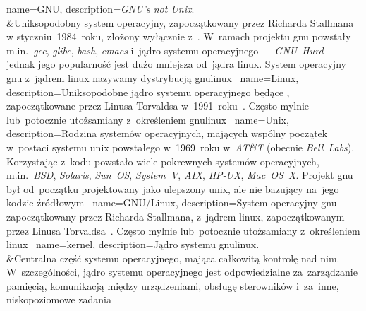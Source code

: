 %
%

{
	name={GNU},
	description={\emph{GNU’s not Unix}.\\&Uniksopodobny system operacyjny, zapoczątkowany przez Richarda Stallmana w styczniu~1984~roku, złożony wyłącznie z~. W~ramach projektu \gls{gnu} powstały m.in.~\emph{gcc}, \emph{glibc}, \emph{bash}, \emph{emacs} i~jądro systemu operacyjnego --- \emph{GNU~Hurd} --- jednak jego popularność jest dużo mniejsza od~jądra \gls{linux}. System operacyjny \gls{gnu} z~jądrem \gls{linux} nazywamy dystrybucją \gls{gnulinux}~\cite{gnu,gnulinux,gnu-faq,wiki:linux-naming-controversy}}
}
{
	name={Linux},
	description={Uniksopodobne jądro systemu operacyjnego będące , zapoczątkowane przez Linusa Torvaldsa w~1991~roku~\cite{linux-kernel}. Często mylnie lub~potocznie utożsamiany z~określeniem \gls{gnulinux}~\cite{gnu-faq,wiki:linux-naming-controversy}}
}
{
	name={Unix},
	description={Rodzina systemów operacyjnych, mających wspólny początek w~postaci systemu \gls{unix} powstałego w~1969~roku w~\emph{AT\&T} (obecnie \emph{Bell~Labs}). Korzystając z~kodu  powstało wiele pokrewnych systemów operacyjnych, m.in.~\emph{BSD}, \emph{Solaris}, \emph{Sun~OS}, \emph{System~V}, \emph{AIX}, \emph{HP-UX}, \emph{Mac~OS~X}. Projekt \gls{gnu} był od~początku projektowany jako ulepszony \gls{unix}, ale nie bazujący na~jego kodzie źródłowym~\cite{gnu-initial-msg}}
}
{
	name={GNU/Linux},
	description={System operacyjny \gls{gnu} zapoczątkowany przez Richarda Stallmana, z~jądrem \gls{linux}, zapoczątkowanym przez Linusa Torvaldsa~\cite{gnulinux}. Często mylnie lub~potocznie utożsamiany z~określeniem \gls{linux}~\cite{gnu-faq,wiki:linux-naming-controversy}}
}
{
	name={kernel},
	description={Jądro systemu \gls{gnulinux}.\\&Centralna część systemu operacyjnego, mająca całkowitą kontrolę nad nim. W~szczególności, jądro systemu operacyjnego jest odpowiedzialne za~zarządzanie pamięcią, komunikacją między urządzeniami, obsługę sterowników i~za~inne, niskopoziomowe zadania}
}
